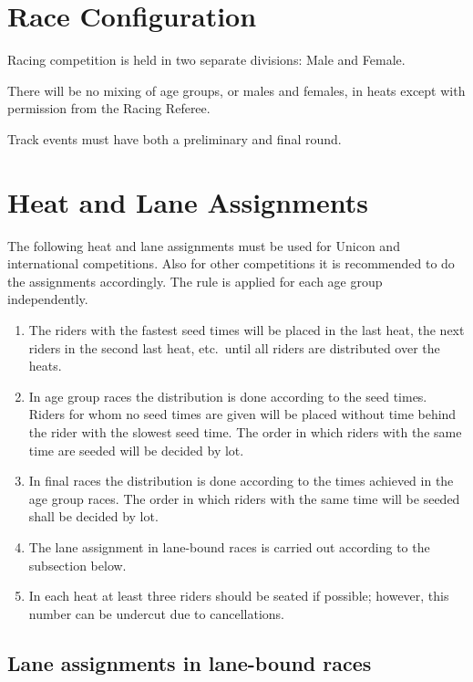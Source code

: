 \section{Race Configuration}

Racing competition is held in two separate divisions: Male and Female.

There will be no mixing of age groups, or males and females, in heats except with permission from the Racing Referee.

Track events must have both a preliminary and final round.

\section{Heat and Lane Assignments}

The following heat and lane assignments must be used for Unicon and international competitions.
Also for other competitions it is recommended to do the assignments accordingly.
The rule is applied for each age group independently.
\begin{enumerate}
\item The riders with the fastest seed times will be placed in the last heat, the next riders in the second last heat, etc.\ until all riders are distributed over the heats.
\item In age group races the distribution is done according to the seed times.
Riders for whom no seed times are given will be placed without time behind the rider with the slowest seed time.
The order in which riders with the same time are seeded will be decided by lot.
\item In final races the distribution is done according to the times achieved in the age group races.
The order in which riders with the same time will be seeded shall be decided by lot.
\item The lane assignment in lane-bound races is carried out according to the subsection below.
\item In each heat at least three riders should be seated if possible; however, this number can be undercut due to cancellations.
\end{enumerate}

\subsection{Lane assignments in lane-bound races}

